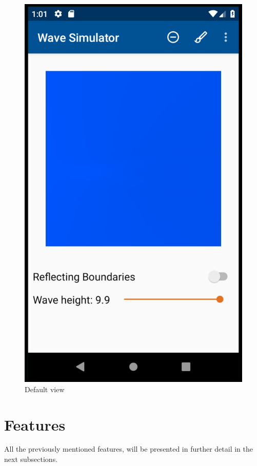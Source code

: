 \documentclass[11pt,a4paper]{article}
\begin{document}
\begin{figure}[H]
\begin{center}
\vspace{3cm}
\includegraphics[scale= 1]{DefaultView.png}
\caption{Default view}
\end{center}
\end{figure}







\pagebreak
\section{Features}
All the previously mentioned features, will be presented in further detail in the next subsections.
\end{document}

